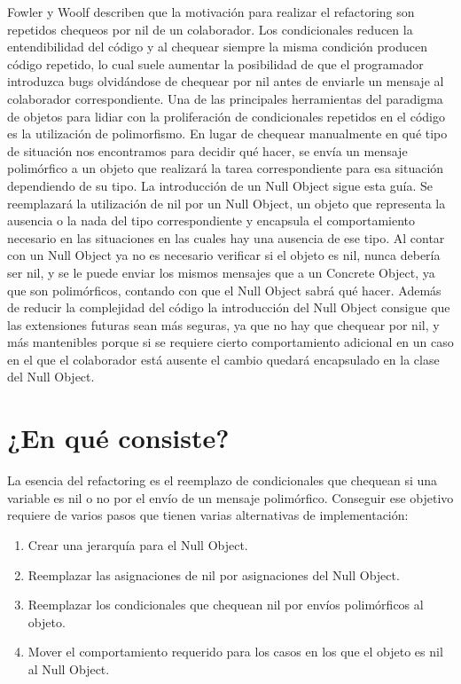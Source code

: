 Fowler y Woolf describen que la motivación para realizar el refactoring son repetidos chequeos por
nil de un colaborador. Los condicionales reducen la entendibilidad del código y al chequear siempre
la misma condición producen código repetido, lo cual suele aumentar la posibilidad de que el
programador introduzca bugs olvidándose de chequear por nil antes de enviarle un mensaje al
colaborador correspondiente. Una de las principales herramientas del paradigma de objetos para
lidiar con la proliferación de condicionales repetidos en el código es la utilización de
polimorfismo. En lugar de chequear manualmente en qué tipo de situación nos encontramos para decidir
qué hacer, se envía un mensaje polimórfico a un objeto que realizará la tarea correspondiente para
esa situación dependiendo de su tipo. La introducción de un Null Object sigue esta guía. Se
reemplazará la utilización de nil por un Null Object, un objeto que representa la ausencia o la
nada del tipo correspondiente y encapsula el comportamiento necesario en las situaciones en las
cuales hay una ausencia de ese tipo. Al contar con un Null Object ya no es necesario verificar si el
objeto es nil, nunca debería ser nil, y se le puede enviar los mismos mensajes que a un Concrete
Object, ya que son polimórficos, contando con que el Null Object sabrá qué hacer. Además de reducir 
la complejidad del código la introducción del Null Object consigue que las extensiones futuras sean
más seguras, ya que no hay que chequear por nil, y más mantenibles porque si se requiere cierto
comportamiento adicional en un caso en el que el colaborador está ausente el cambio quedará
encapsulado en la clase del Null Object.




\section{¿En qué consiste?}

La esencia del refactoring es el reemplazo de condicionales que chequean si una variable es nil
o no por el envío de un mensaje polimórfico. Conseguir ese objetivo requiere de varios pasos que tienen
varias alternativas de implementación:

\begin{enumerate}
    \item Crear una jerarquía para el Null Object.
    \item Reemplazar las asignaciones de nil por asignaciones del Null Object.
    \item Reemplazar los condicionales que chequean nil por envíos polimórficos al objeto.
    \item Mover el comportamiento requerido para los casos en los que el objeto es nil al Null
    Object.
\end{enumerate}

